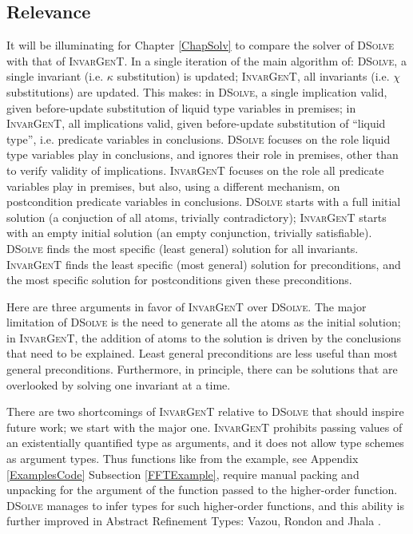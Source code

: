 \documentclass{article}
\newcommand{\tmname}[1]{\textsc{#1}}
\newcommand{\tmverbatim}[1]{{\ttfamily{#1}}}
\begin{document}
\subsection{Relevance}

It will be illuminating for Chapter \ref{ChapSolv} to compare the solver of
{\tmname{DSolve}} with that of {\tmname{InvarGenT}}. In a single iteration of
the main algorithm of: {\tmname{DSolve}}, a single invariant (i.e. $\kappa$
substitution) is updated; {\tmname{InvarGenT}}, all invariants (i.e. $\chi$
substitutions) are updated. This makes: in {\tmname{DSolve}}, a single
implication valid, given before-update substitution of liquid type variables
in premises; in {\tmname{InvarGenT}}, all implications valid, given
before-update substitution of ``liquid type'', i.e. predicate variables in
conclusions. {\tmname{DSolve}} focuses on the role liquid type variables play
in conclusions, and ignores their role in premises, other than to verify
validity of implications. {\tmname{InvarGenT}} focuses on the role all
predicate variables play in premises, but also, using a different mechanism,
on postcondition predicate variables in conclusions. {\tmname{DSolve}} starts
with a full initial solution (a conjuction of all atoms, trivially
contradictory); {\tmname{InvarGenT}} starts with an empty initial solution (an
empty conjunction, trivially satisfiable). {\tmname{DSolve}} finds the most
specific (least general) solution for all invariants. {\tmname{InvarGenT}}
finds the least specific (most general) solution for preconditions, and the
most specific solution for postconditions given these preconditions.

Here are three arguments in favor of {\tmname{InvarGenT}} over
{\tmname{DSolve}}. The major limitation of {\tmname{DSolve}} is the need to
generate all the atoms as the initial solution; in {\tmname{InvarGenT}}, the
addition of atoms to the solution is driven by the conclusions that need to be
explained. Least general preconditions are less useful than most general
preconditions. Furthermore, in principle, there can be solutions that are
overlooked by solving one invariant at a time.

There are two shortcomings of {\tmname{InvarGenT}} relative to
{\tmname{DSolve}} that should inspire future work; we start with the major
one. {\tmname{InvarGenT}} prohibits passing values of an existentially
quantified type as arguments, and it does not allow type schemes as argument
types. Thus functions like \tmverbatim{ffor} from the \tmverbatim{fft}
example, see Appendix \ref{ExamplesCode} Subsection \ref{FFTExample}, require
manual packing and unpacking for the argument of the function passed to the
higher-order function. {\tmname{DSolve}} manages to infer types for such
higher-order functions, and this ability is further improved in Abstract
Refinement Types: Vazou, Rondon and Jhala {\cite{AbstractLiquid}}.
\end{document}
